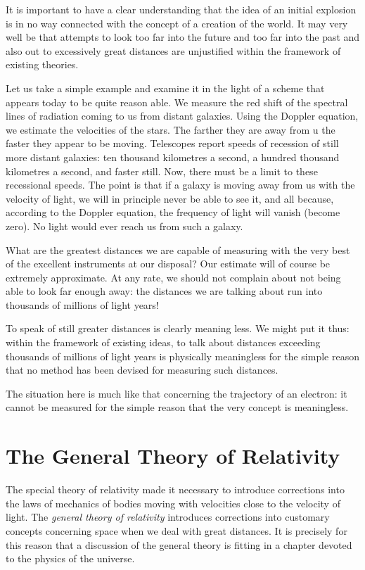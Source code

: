 It is important to have a clear understanding that the idea of an initial explosion is in no way connected with the concept of a creation of the world. It may very well be that attempts to look too far into the future and too far into the past and also out to excessively great distances are unjustified within the framework of existing theories.

Let us take a simple example and examine it in the light of a scheme that appears today to be quite reason­ able. We measure the red shift of the spectral lines of radiation coming to us from distant galaxies. Using the Doppler equation, we estimate the velocities of the stars. The farther they are away from u the faster they appear to be moving. Telescopes report speeds of recession of still more distant galaxies: ten thousand kilometres a second, a hundred thousand kilometres a second, and faster still. Now, there must be a limit to these recessional speeds. The point is that if a galaxy is moving away from us with the velocity of light, we will in principle never be able to see it, and all because, according to the Doppler equation, the frequency of light will vanish (become zero). No light would ever reach us from such a galaxy.

What are the greatest distances we are capable of mea­suring with the very best of the excellent instruments at our disposal? Our estimate will of course be extremely approximate. At any rate, we should not complain about not being able to look far enough away: the distances we are talking about run into thousands of millions of light years!

To speak of still greater distances is clearly meaning­ less. We might put it thus: within the framework of existing ideas, to talk about distances exceeding thousands of millions of light years is physically meaningless for the simple reason that no method has been devised for measur­ing such distances.

The situation here is much like that concerning the trajectory of an electron: it cannot be measured for the simple reason that the very concept is meaningless.

\section{The General Theory of Relativity}

The special theory of relativity made it necessary to introduce corrections into the laws of mechanics of bodies moving with velocities close to the velocity of light. The \emph{general theory of relativity} introduces corrections into cus­tomary concepts concerning space when we deal with great distances. It is precisely for this reason that a discussion of the general theory is fitting in a chapter devoted to the physics of the universe.

